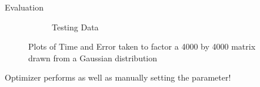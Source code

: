 \documentclass[final]{beamer}
\begin{document}
{\begin{frame}{}
\begin{center}
\begin{columns}[t]
\begin{column}{0.32\textwidth}
\begin{block}{\huge Evaluation}
\begin{itemize}
{\begin{figure}
\begin{subfigure}[b]{.45\textwidth}
\begin{center}
		\caption{Testing Data}
\end{center}
	\end{subfigure}
\hfill
	\caption{Plots of Time and Error taken to factor a 4000 by 4000 matrix drawn from a Gaussian distribution}	
\end{figure}
\item Optimizer performs as well as manually setting the parameter!}
\end{itemize}

\vspace{1cm}

    \end{block}

\vspace{1.5cm}


\end{column}
\end{columns}
\end{center}
\end{frame}}
\end{document}
